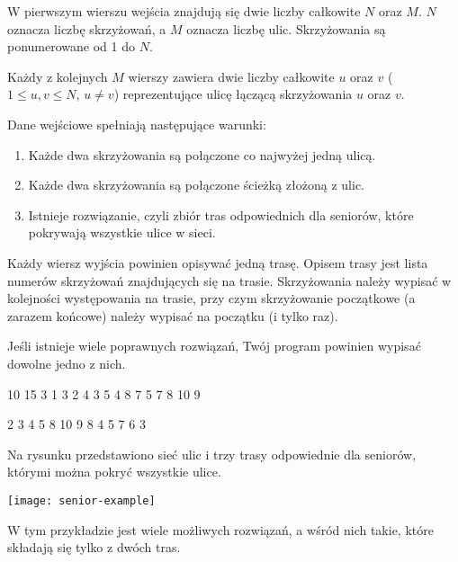 \documentclass{boi2014-pl}
\begin{document}
    W pierwszym wierszu wejścia znajdują się dwie liczby całkowite $N$ oraz $M$.
    $N$ oznacza liczbę skrzyżowań, a $M$ oznacza liczbę ulic.
    Skrzyżowania są ponumerowane od 1 do $N$.

    Każdy z kolejnych $M$ wierszy zawiera dwie liczby całkowite
    $u$ oraz $v$ ($1 \le u,v \le N$, $u \ne v$) reprezentujące ulicę łączącą
    skrzyżowania $u$ oraz $v$.

    Dane wejściowe spełniają następujące warunki:
    \begin{enumerate}
        \item Każde dwa skrzyżowania są połączone co najwyżej jedną ulicą.
        \item Każde dwa skrzyżowania są połączone ścieżką złożoną z ulic.
        \item Istnieje rozwiązanie, czyli zbiór tras odpowiednich dla seniorów,
          które pokrywają wszystkie ulice w sieci.
    \end{enumerate}

    \Output
    Każdy wiersz wyjścia powinien opisywać jedną trasę.
    Opisem trasy jest lista numerów skrzyżowań znajdujących się na trasie.
    Skrzyżowania należy wypisać w kolejności występowania na trasie,
    przy czym skrzyżowanie początkowe (a zarazem końcowe) należy wypisać na początku (i tylko raz).

    Jeśli istnieje wiele poprawnych rozwiązań, Twój program powinien wypisać dowolne jedno z nich.

    \Example

    \example
    {
        10 15  3  1 3  2 4  3 5  4 8  7  5 7  8  10  9
    }
    {
        2 3 4 5 8 10 9  8 4  5 7 6 3

    }
    {
        Na rysunku przedstawiono sieć ulic i trzy trasy odpowiednie dla seniorów,
        którymi można pokryć wszystkie ulice.

        \texttt{[image: senior-example]}

        W tym przykładzie jest wiele możliwych rozwiązań, a wśród nich takie, które
        składają się tylko z dwóch tras.
    
    }
\end{document}
